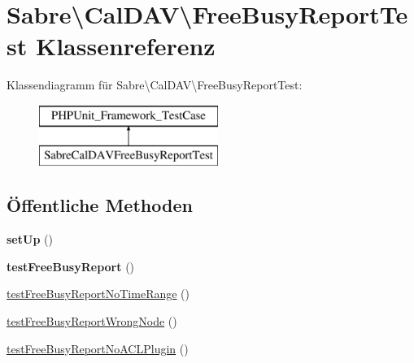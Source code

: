\hypertarget{class_sabre_1_1_cal_d_a_v_1_1_free_busy_report_test}{}\section{Sabre\textbackslash{}Cal\+D\+AV\textbackslash{}Free\+Busy\+Report\+Test Klassenreferenz}
\label{class_sabre_1_1_cal_d_a_v_1_1_free_busy_report_test}
Klassendiagramm für Sabre\textbackslash{}Cal\+D\+AV\textbackslash{}Free\+Busy\+Report\+Test\+:\begin{figure}[H]
\begin{center}
\leavevmode
\includegraphics[height=2.000000cm]{class_sabre_1_1_cal_d_a_v_1_1_free_busy_report_test}
\end{center}
\end{figure}
\subsection*{Öffentliche Methoden}
\begin{DoxyCompactItemize}
\item 
\mbox{\label{class_sabre_1_1_cal_d_a_v_1_1_free_busy_report_test_a95d3e79c159a77707772242cf3aa82d3}} 
{\bfseries set\+Up} ()
\item 
\mbox{\label{class_sabre_1_1_cal_d_a_v_1_1_free_busy_report_test_a8a413e4f8ad8511f2e3c67628067817b}} 
{\bfseries test\+Free\+Busy\+Report} ()
\item 
\mbox{\hyperlink{class_sabre_1_1_cal_d_a_v_1_1_free_busy_report_test_a95015cd1ec70a78d90615b42267ffa7d}{test\+Free\+Busy\+Report\+No\+Time\+Range}} ()
\item 
\mbox{\hyperlink{class_sabre_1_1_cal_d_a_v_1_1_free_busy_report_test_ad692d9e68cbc6e141bc7436d6dcc3798}{test\+Free\+Busy\+Report\+Wrong\+Node}} ()
\item 
\mbox{\hyperlink{class_sabre_1_1_cal_d_a_v_1_1_free_busy_report_test_a95944dbc3fc3a9980638ae843117c0d4}{test\+Free\+Busy\+Report\+No\+A\+C\+L\+Plugin}} ()
\end{DoxyCompactItemize}
